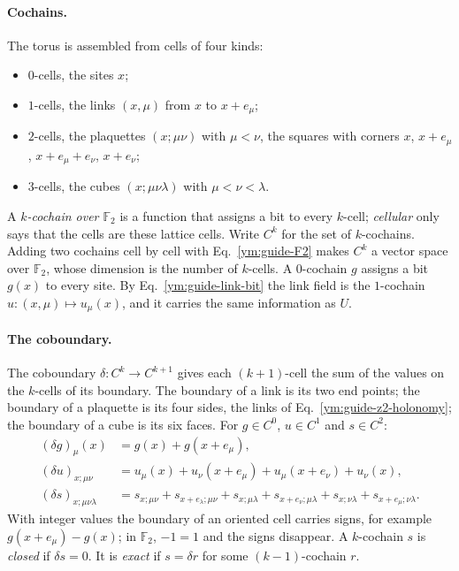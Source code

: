 \paragraph{Cochains.}
The torus is assembled from cells of four kinds:
\begin{itemize}
\item $0$-cells, the sites $x$;
\item $1$-cells, the links $(x,\mu)$ from $x$ to $x+e_\mu$;
\item $2$-cells, the plaquettes $(x;\mu\nu)$ with $\mu<\nu$, the
 squares with corners $x$, $x+e_\mu$, $x+e_\mu+e_\nu$, $x+e_\nu$;
\item $3$-cells, the cubes $(x;\mu\nu\lambda)$ with $\mu<\nu<\lambda$.
\end{itemize}
A \emph{$k$-cochain over $\mathbb F_2$} is a function that assigns a bit to
every $k$-cell; \emph{cellular} only says that the cells are these lattice
cells. Write $C^k$ for the set of $k$-cochains. Adding two cochains cell by
cell with Eq.~\eqref{ym:guide-F2} makes $C^k$ a vector space over
$\mathbb F_2$, whose dimension is the number of $k$-cells. A $0$-cochain
$g$ assigns a bit $g(x)$ to every site. By Eq.~\eqref{ym:guide-link-bit}
the link field is the $1$-cochain $u\colon(x,\mu)\mapsto u_\mu(x)$, and it
carries the same information as $U$.

\paragraph{The coboundary.}
The coboundary $\delta\colon C^k\to C^{k+1}$ gives each $(k+1)$-cell the sum
of the values on the $k$-cells of its boundary. The boundary of a link is
its two end points; the boundary of a plaquette is its four sides, the links
of Eq.~\eqref{ym:guide-z2-holonomy}; the boundary of a cube is its six faces.
For $g\in C^0$, $u\in C^1$ and $s\in C^2$:
\begin{align}
 (\delta g)_\mu(x)&=g(x)+g(x+e_\mu),\label{ym:guide-delta0}\\
 (\delta u)_{x;\mu\nu}&=u_\mu(x)+u_\nu(x+e_\mu)+u_\mu(x+e_\nu)+u_\nu(x),
 \label{ym:guide-delta1}\\
 (\delta s)_{x;\mu\nu\lambda}&=s_{x;\mu\nu}+s_{x+e_\lambda;\mu\nu}
 +s_{x;\mu\lambda}+s_{x+e_\nu;\mu\lambda}
 +s_{x;\nu\lambda}+s_{x+e_\mu;\nu\lambda}.\label{ym:guide-delta2}
\end{align}
With integer values the boundary of an oriented cell carries signs, for
example $g(x+e_\mu)-g(x)$; in $\mathbb F_2$, $-1=1$ and the signs disappear.
A $k$-cochain $s$ is \emph{closed} if $\delta s=0$. It is \emph{exact} if
$s=\delta r$ for some $(k-1)$-cochain $r$.

